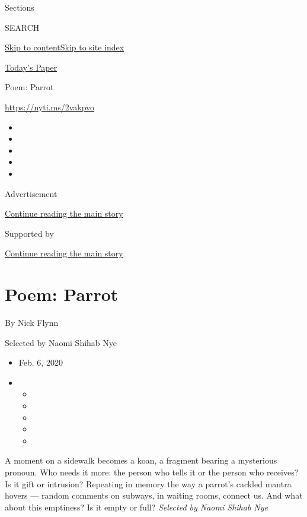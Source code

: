 Sections

SEARCH

\protect\hyperlink{site-content}{Skip to
content}\protect\hyperlink{site-index}{Skip to site index}

\href{https://myaccount.nytimes3xbfgragh.onion/auth/login?response_type=cookie\&client_id=vi}{}

\href{https://www.nytimes3xbfgragh.onion/section/todayspaper}{Today's
Paper}

Poem: Parrot

\url{https://nyti.ms/2vakpvo}

\begin{itemize}
\item
\item
\item
\item
\item
\end{itemize}

Advertisement

\protect\hyperlink{after-top}{Continue reading the main story}

Supported by

\protect\hyperlink{after-sponsor}{Continue reading the main story}

\hypertarget{poem-parrot}{%
\section{Poem: Parrot}\label{poem-parrot}}

By Nick Flynn

Selected by Naomi Shihab Nye

\begin{itemize}
\item
  Feb. 6, 2020
\item
  \begin{itemize}
  \item
  \item
  \item
  \item
  \item
  \end{itemize}
\end{itemize}

A moment on a sidewalk becomes a koan, a fragment bearing a mysterious
pronoun. Who needs it more: the person who tells it or the person who
receives? Is it gift or intrusion? Repeating in memory the way a
parrot's cackled mantra hovers --- random comments on subways, in
waiting rooms, connect us. And what about this emptiness? Is it empty or
full? \emph{Selected by Naomi Shihab Nye}

